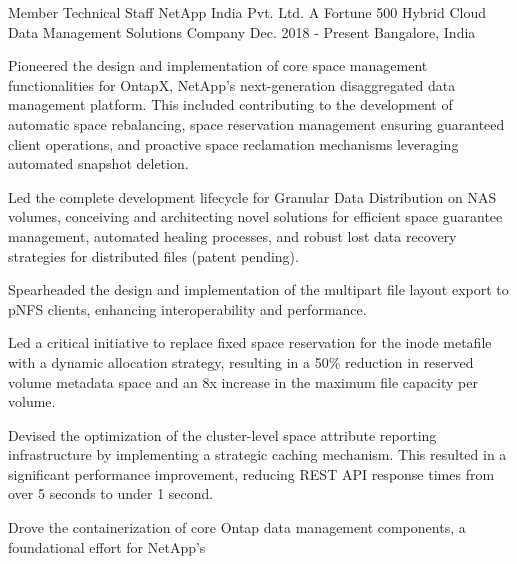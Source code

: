 

\begin{cventries}

  \expentry
    {Member Technical Staff} %
    {NetApp} {India Pvt. Ltd.} %
    {A Fortune 500 Hybrid Cloud Data Management Solutions Company} %
    {Dec. 2018 - Present} %
    {Bangalore, India} %
    {
      \begin{cvitems} %
        \item {Pioneered the design and implementation of core space management functionalities for OntapX, NetApp's
		next-generation disaggregated data management platform. This included contributing to the development
		of automatic space rebalancing, space reservation management ensuring guaranteed client operations,
		and proactive space reclamation mechanisms leveraging automated snapshot deletion.}
        \item {Led the complete development lifecycle for Granular Data Distribution on NAS volumes, conceiving and
		architecting novel solutions for efficient space guarantee management, automated healing processes, and
		robust lost data recovery strategies for distributed files (patent pending).}
	\item {Spearheaded the design and implementation of the multipart file layout export to pNFS clients, enhancing
		interoperability and performance.}
	\item {Led a critical initiative to replace fixed space reservation for the inode metafile with a dynamic
		allocation strategy, resulting in a 50\% reduction in reserved volume metadata space and an 8x increase in
		the maximum file capacity per volume.}
        \item {Devised the optimization of the cluster-level space attribute reporting infrastructure by implementing a
		strategic caching mechanism. This resulted in a significant performance improvement, reducing REST API
		response times from over 5 seconds to under 1 second.}
	\item {Drove the containerization of core Ontap data management components, a foundational effort for NetApp's
}
\end{cvitems}}
\end{cventries}
